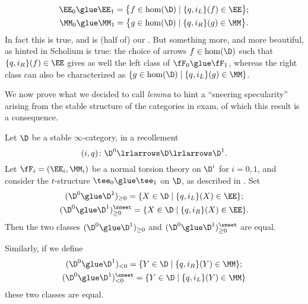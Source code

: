 \begin{gather}
\EE_0\glue\EE_1 = \big\{f\in\hom(\D)\mid 
\{q, i_L\}(f)\in \EE 
\big\};\label{BBDleftclass}\\
\MM_0\glue\MM_1 = \big\{g\in\hom(\D)\mid 
\{q, i_R\}(g) \in \MM
\big\}.
\end{gather}
In fact this is true, and is (half of) our . 
But something more, and more beautiful, as hinted in Scholium  is true: the choice of arrows $f\in\hom(\D)$ such that $\{q, i_R\}(f)\in \EE$ gives as well the left class of $\fF_0 \glue \fF_1$, whereas the right class can also be characterized as $\{g\in\hom(\D)\mid \{q, i_L\}(g) \in \MM\}$. 

We now prove what we decided to call \emph{\ror lemma} to hint a ``sneering specularity'' arising from the stable structure of the categories in exam, of which this result is a consequence.
\begin{lemma}\label{rorschach}
Let $\D$ be a stable $\infty$\hyp{}category, in a recollement 
$$
(i,q)\colon \D^0 \lrlarrows  \D  \lrlarrows  \D^1.
$$ 
Let $\fF_i = (\EE_i,\MM_i)$ be a normal torsion theory on $\D^i$ for $i=0,1$, and consider the $t$\hyp{}structure $\tee_0\glue \tee_1$ on $\D$, as described in . Set 
\begin{gather*}
(\D^0\glue \D^1)_{\ge 0} = \{X\in \D\mid \{q, i_L\}(X)\in \EE \};\\
(\D^0\glue \D^1)_{\ge 0}^\sneet = \{X\in \D\mid \{q, i_R\}(X)\in \EE \}.
\end{gather*}
Then the two classes $(\D^0\glue \D^1)_{\ge 0} $ and $(\D^0\glue \D^1)_{\ge 0}^\sneet$ are equal.

Similarly, if we define
\begin{gather*}
(\D^0\glue \D^1)_{<0} = \{Y\in \D\mid \{q, i_R\}(Y)\in \MM \};\\
(\D^0\glue \D^1)_{<0}^\sneet = \{Y\in \D\mid \{q, i_L\}(Y)\in \MM \}
\end{gather*}
these two classes are equal.
\end{lemma}
